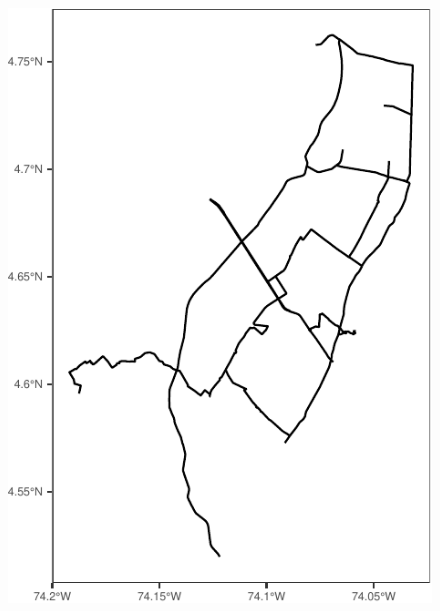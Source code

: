 \documentclass[
  shownotes,
  xcolor={svgnames},
  hyperref={colorlinks,citecolor=DarkBlue,linkcolor=DarkRed,urlcolor=DarkBlue}
  ]{beamer}
\begin{document}
\begin{frame}[fragile]
\begin{minipage}[t]{0.43\linewidth}
\begin{figure}[H]
			\includegraphics[scale=0.6]{figures/unnamed-chunk-2-1.pdf}
 \end{figure}
    \end{minipage}

\end{frame}
\end{document}
